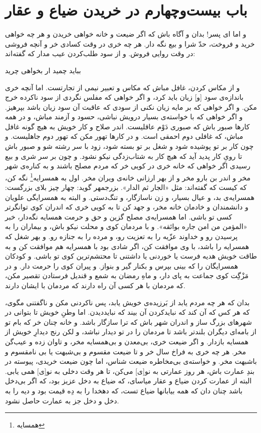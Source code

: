 \section*{باب بیست‌و‌چهارم
در خریدن ضیاع و عقار}

و اما اى پسر! بدان و آگاه باش كه اگر ضيعت و خانه خواهى خريدن و هر چه خواهى خريد و فروخت، حدّ شرا و بيع نگه دار. هر چه خرى در وقت كسادى خر و آنچه فروشى در وقت روايى فروش. و از سود طلب‌كردن عيب مدار كه گفته‌اند:
\begin{quad}
ببايد چميد ار بخواهى چريد 
\end{quad}
و از مکاس كردن، غافل مباش كه مكاس و تعبير نيمى از تجارتست. اما آنچه خرى باندازه‌ی سود [و] زيان بايد كرد، و اگر خواهى كه مفلس نگردى از سود ناكرده خرج مكن. و اگر خواهى كه بر مايه زيان نكنى از سودى كه عاقبت آن سود زيان باشد بپرهيز. و اگر خواهى كه با خواسته‌ی بسيار درويش نباشى، حسود و آزمند مباش، و در همه كارها صبور باش كه صبورى دَوْم عاقليست. اندر صلاح و كار خويش به هيچ گونه غافل مباش، كه غافلى دوم احمقى است. و در كارها تهور مكن كه تهور دوم جاهليست. و چون كار بر تو پوشيده شود و شغل بر تو بسته شود، زود با سر رشته شو و صبور باش تا روىِ كار پديد آيد كه هيچ كار به شتاب‌زدگى نيكو نشود. و چون بر سر شرى و بيع رسيدى اگر خواهى كه خانه خرى در كويى خر كه مردم مصلح باشند و به كناره‌ی شهر مخر و اندر بن بارو مخر و از بهر ارزانى خانه‌ی ويران مخر. اول به همسرايه\footnote{همسایه} نگه كن، كه كيست كه گفته‌اند: مثل «الجار ثم الدار». بزرجمهر گويد: چهار چيز بلاى بزرگست: همسرايه‌ی بد، و عيال بسيار، و زن ناسازگار، و تنگ‌دستى. و البته به همسرايگى علويان و دانشمندان و خادمان خانه مخر، و جهد كن تا به كويى خرى كه اندران كوى توانگرتر كسى تو باشى. اما همسرايه‌ی مصلح گزين و حق و حرمت همسايه نگه‌دار، خبر «المؤمن من امن جاره بوائقه». و با مردمان كوى و محلت نيكو باش، و بيماران را به پرسيدن رو و خداوند عزّيه را به تعزيت رو، و مرده را به جنازه رو. و بهر شغل كه همسرايه را باشد، با وى موافقت كن، اگر شادى بود با همسرايه هم موافقت كن و به طاقت خويش هديه فرست يا خوردنى يا داشتنى تا محتشم‌ترين كوى تو باشى. و كودكان همسرايگان را كه بينى بپرس و بكنار گير و بنواز. و پيران كوى را حرمت دار. و در مَزْگِت كوى جماعت به پاى دار، و ماهِ رمضان به شمع و قنديل فرستادن تقصير مكن، كه مردمان با هر كسى آن راه دارند كه مردمان با ايشان دارند.

بدان كه هر چه مردم يابد از بَرزيده‌ی خويش يابد، پس ناكردنى مكن و ناگفتنى مگوى، كه هر كس كه آن كند كه نبايدكردن آن بيند كه نبايد‌ديدن. اما وطنِ خويش تا بتوانى در شهرهاى بزرگ ساز و اندران شهر باش كه ترا سازگار باشد. و خانه چنان خر كه بام تو از بامه‌اى ديگران بلندتر باشد تا مردمان را در تو ديدار نباشد، و لكن رنج ديدارِ خويش از همسايه بازدار. و اگر ضيعت خرى، بى‌معدن و بى‌همسايه مخر، و تاوان زده و عيب‌گن مخر. هر چه خرى به فراخ سال خر و تا ضيعت مقسوم و بى‌شبهت يا بى نامقسوم و باشبهت مخر. و خواسته‌ی بى‌مخاطره ضيعت شناس، اما چون ضيعت خريدى، پيوسته در بندِ عمارت باش، هر روز عمارتى به نو[ى] مى‌كن، تا هر وقت دخلى به نو[ى] همى يابى. البته از عمارت كردن ضياع و عقار مياساى، كه ضياع به دخل عزيز بود، كه اگر بى‌دخل باشد چنان دان كه همه بيابانها ضياع تست، كه دهخدا را به دِه قيمت بود و ديه را به دخل و دخل جز به عمارت حاصل نشود.


\newpage
